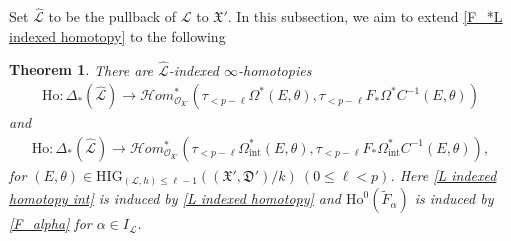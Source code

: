 \documentclass[12pt, a4paper]{article}
\newtheorem{theorem}{Theorem}[section]
\begin{document}
Set $\hat{\mathcal L}$ to be the pullback of $\mathcal L$ to $\mathfrak X'$. In this subsection, we aim to extend \eqref{F_*L indexed homotopy} to the following 
\begin{theorem}\label{infty homotopy non-nilpotent}
There are $\hat{\mathcal L}$-indexed $\infty$-homotopies
\begin{eqnarray}\label{L indexed homotopy}
\mathrm{Ho}:\Delta_*(\hat{\mathcal L})\to\mathcal Hom^*_{\mathcal O_{\mathfrak X'}}(\tau_{<p-\ell}\Omega^*(E,\theta),\tau_{<p-\ell}F_*\Omega^*C^{-1}(E,\theta))
\end{eqnarray}
and
\begin{eqnarray}\label{L indexed homotopy int}
\mathrm{Ho}:\Delta_*(\hat{\mathcal L})\to\mathcal Hom^*_{\mathcal O_{\mathfrak X'}}(\tau_{<p-\ell}\Omega_\mathrm{int}^*(E,\theta),\tau_{<p-\ell}F_*\Omega_\mathrm{int}^*C^{-1}(E,\theta)),
\end{eqnarray}
for $(E,\theta)\in\mathrm{HIG}_{(\mathcal L,h)\leq\ell-1}((\mathfrak X',\mathfrak D')/k)~(0\leq\ell<p)$. Here \eqref{L indexed homotopy int} is induced by \eqref{L indexed homotopy} and $\mathrm{Ho}^0(\tilde F_\alpha)$ is induced by \eqref{F_alpha} for $\alpha\in I_{\mathcal L}$.
 \end{theorem}
\end{document}
